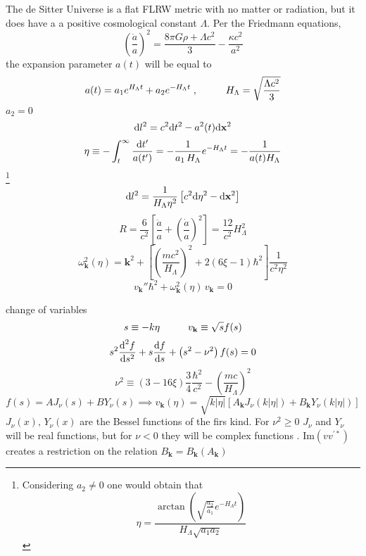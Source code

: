 The de Sitter Universe is a flat FLRW metric with no matter or radiation, but it does have a a positive cosmological constant $\Lambda$. Per the Friedmann equations,
\begin{equation}
	\left(\frac{\dot{a}}{a}\right)^2=\frac{8\pi G\rho+\Lambda c^2}{3}-\frac{\kappa c^2}{a^2}
\end{equation}
the expansion parameter $a(t)$ will be equal to
\begin{equation}
	a(t)=a_1e^{H_\Lambda t}+a_2e^{-H_\Lambda t}\;,\hspace{1.0cm} H_\Lambda=\sqrt{\frac{\Lambda c^2}{3}}
\end{equation}
$a_2=0$
\begin{equation}
	\text{d} l^2=c^2\text{d} t^2-a^2(t)\text{d}\mathbf{x}^2
\end{equation}
\begin{equation}
	\eta\equiv -\int_t^\infty\frac{\text{d} t'}{a(t')}=-\frac{1}{a_1\,H_\Lambda}e^{-H_\Lambda t}=-\frac{1}{a(t)H_\Lambda}
\end{equation}
\footnote{Considering $a_2\not=0$ one would obtain that
$$\eta=\frac{\arctan\left(\sqrt{\frac{a_2}{a_1}}e^{-H_\Lambda t}\right)}{H_\Lambda\sqrt{a_1a_2}}$$}
\begin{equation}
	\text{d} l^2= \frac{1}{H_\Lambda\eta^2}\left[c^2\text{d}\eta^2-\text{d} \mathbf{x}^2\right]
\end{equation}
\begin{equation}
	R=\frac{6}{c^2}\left[\frac{\ddot{a}}{a}+\left(\frac{\dot{a}}{a}\right)^2\right]=\frac{12}{c^2}H_\Lambda^2
\end{equation}
\begin{equation}
	\omega^2_\mathbf{k}(\eta)=\mathbf{k}^2+\left[\left(\frac{mc^2}{H_\Lambda}\right)^2+2\left(6\xi-1\right)\hbar^2\right]\frac{1}{c^2\eta^2}
\end{equation}
\begin{equation}
	v_\mathbf{k}''\hbar^2+\omega^2_\mathbf{k}(\eta)\,v_\mathbf{k}=0
\end{equation}

change of variables
\begin{equation}
	s\equiv -k\eta\hspace{1.0cm}v_\mathbf{k}\equiv \sqrt{s}f(s)
\end{equation}
\begin{equation}
	s^2\frac{\text{d}^2f}{\text{d} s^2}+s\frac{\text{d} f}{\text{d} s}+\left(s^2-\nu^2\right)f(s)=0
\end{equation}
\begin{equation}
	\nu^2\equiv \left(3-16\xi\right)\frac{3}{4}\frac{\hbar^2}{c^2}-\left(\frac{mc}{H_\Lambda}\right)^2
\end{equation}
\begin{equation}
	f(s)=AJ_\nu(s)+BY_\nu(s)\implies v_\mathbf{k}(\eta)=\sqrt{k|\eta|}\left[A_\mathbf{k}J_\nu(k|\eta|)+B_\mathbf{k}Y_\nu(k|\eta|)\right]
\end{equation}
$J_\nu(x),\,Y_\nu(x)$ are the Bessel functions of the firs kind. For $\nu^2\geq 0$ $J_\nu$ and $Y_\nu$ will be real functions, but for $\nu<0$ they will be complex functions \cite{BesselComplex}. $\text{Im}(vv^{'*})$ creates a restriction on the relation $B_\mathbf{k}=B_\mathbf{k}(A_\mathbf{k})$